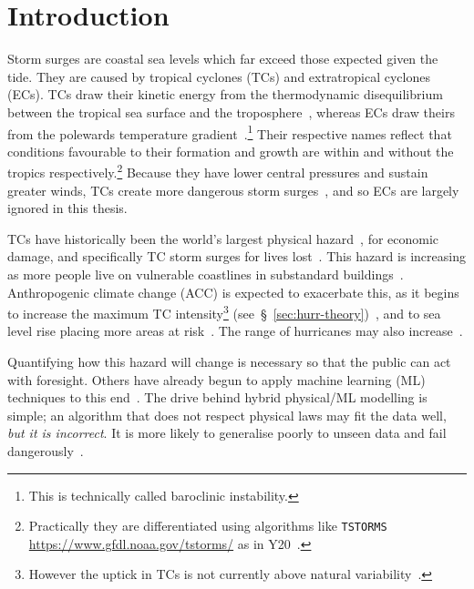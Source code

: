 \section{Introduction}
\label{sec:1_Introduction}


Storm surges are coastal sea levels which far exceed those
expected given the tide.
They are caused by tropical cyclones
(TCs) and extratropical cyclones (ECs).
TCs draw their kinetic energy from the thermodynamic disequilibrium between
the tropical sea surface and the troposphere~\cite{emanuel1986air, emanuel1987dependence},
whereas ECs draw theirs from the
polewards temperature gradient~\cite{lorenz1960energy, holton2004introduction}.\footnote{
This is technically called baroclinic instability.}
Their respective names reflect that conditions favourable
to their formation and growth are within and without the tropics respectively.\footnote{
Practically they are differentiated using algorithms like \texttt{TSTORMS}
\url{https://www.gfdl.noaa.gov/tstorms/} as in Y20~\cite{ZannaPreprint}.}
Because they have lower central pressures and sustain greater winds,
TCs create more dangerous storm surges~\cite{emanuel2005divine},
and so ECs are largely ignored in this thesis.

TCs have historically been the
world's largest physical hazard~\cite{shultz2005epidemiology},
for economic damage,
and specifically TC storm surges for lives lost~\cite{shultz2005epidemiology,
zhang2009tropical, emanuel2005divine}.
This hazard is increasing as more people live on vulnerable coastlines
in substandard buildings~\cite{emanuel2005divine}.
Anthropogenic climate change (ACC) is expected to exacerbate this,
as it begins to increase the maximum TC intensity\footnote{
However the uptick in TCs is not currently above
 natural variability~\cite{mendelsohn2012impact}.}
(see~§~\ref{sec:hurr-theory})~\cite{emanuel2008hurricanes,emanuel2017will},
and to sea level rise placing more areas at risk~\cite{SROCC}.
The range of hurricanes may also increase~\cite{fedorov2010tropical}.

Quantifying how this hazard will change is necessary
so that the public can act with foresight.
Others have already begun to apply machine learning (ML) techniques to this
end~\cite{kulp2019new, kulp2018coastaldem, tadesse2020data}.
The drive behind hybrid physical/ML modelling is simple;
an algorithm that does not respect physical laws
may fit the data well, \textit{but it is incorrect}.
It is more likely to generalise poorly to unseen data
and fail dangerously~\cite{beucler2019achieving}.

